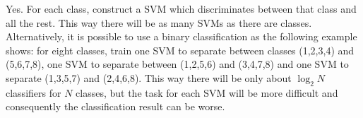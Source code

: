 \begin{enumerate}
  \begin{solution}

    Yes.  For each class, construct a SVM which discriminates
    between that class and all the rest.  This way there will be as many
    SVMs as there are classes.  Alternatively, it is possible to use a
    binary classification as the following example shows: for eight
    classes, train one SVM to separate between classes (1,2,3,4) and
    (5,6,7,8), one SVM to separate between (1,2,5,6) and (3,4,7,8) and
    one SVM to separate (1,3,5,7) and (2,4,6,8).  This way there will be
    only about $\log_2 N$ classifiers for $N$ classes, but the task for
    each SVM will be more difficult and consequently the classification
    result can be worse.

  \end{solution}
  

\end{enumerate}

